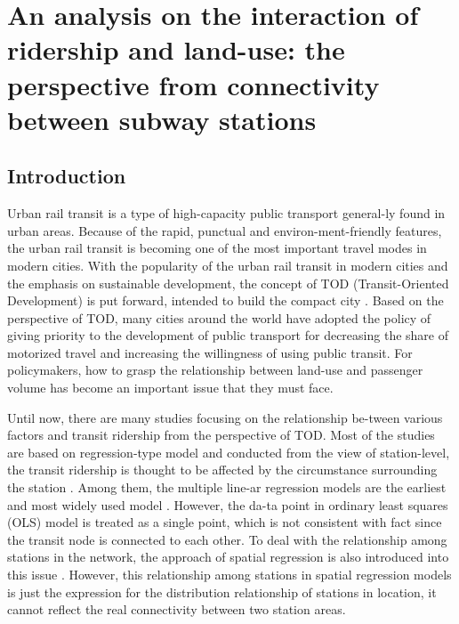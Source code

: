 \chapter{An analysis on the interaction of ridership and land-use: the perspective from connectivity between subway stations}
%
\section{Introduction}
\indent

%
Urban rail transit is a type of high-capacity public transport general-ly found in urban areas. Because of the rapid, punctual and environ-ment-friendly features, the urban rail transit is becoming one of the most important travel modes in modern cities. With the popularity of the urban rail transit in modern cities and the emphasis on sustainable development, the concept of TOD (Transit-Oriented Development) is put forward, intended to build the compact city \cite{calthorpe1993next}. Based on the perspective of TOD, many cities around the world have adopted the policy of giving priority to the development of public transport for decreasing the share of motorized travel and increasing the willingness of using public transit. For policymakers, how to grasp the relationship between land-use and passenger volume has become an important issue that they must face.

%
Until now, there are many studies focusing on the relationship be-tween various factors and transit ridership from the perspective of TOD. Most of the studies are based on regression-type model and conducted from the view of station-level, the transit ridership is thought to be affected by the circumstance surrounding the station \cite{cervero1997travel,taylor2003analyzing,zhao2005transit,estupinan2008relationship,taylor2009nature,sohn2010factors,gutierrez2011transit,jun2015land}. Among them, the multiple line-ar regression models are the earliest and most widely used model \cite{cervero1997travel,gutierrez2011transit}. However, the da-ta point in ordinary least squares (OLS) model is treated as a single point, which is not consistent with fact since the transit node is connected to each other. To deal with the relationship among stations in the network, the approach of spatial regression is also introduced into this issue \cite{cardozo2012application,jun2015land}. However, this relationship among stations in spatial regression models is just the expression for the distribution relationship of stations in location, it cannot reflect the real connectivity between two station areas.

